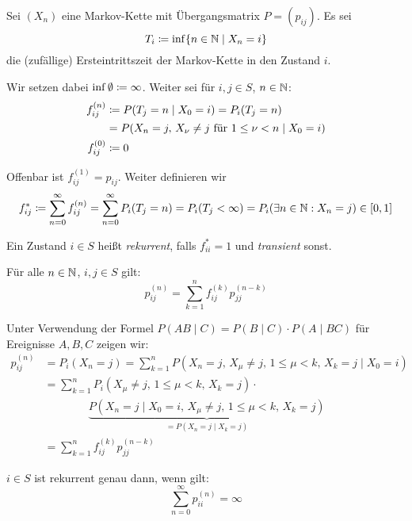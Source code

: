 \documentclass[a4paper,twoside,DIV15,BCOR12mm]{scrbook}
\begin{document}
\pagebreak[2]
Sei $(X_n)$ eine Markov-Kette mit Übergangsmatrix $P=(p_{ij})$. Es sei
\[
T_i \da \inf\{n\in\MdN\mid X_n =i\}
\]
die (zufällige) Ersteintrittszeit der Markov-Kette in den Zustand $i$.

Wir setzen dabei $\inf\emptyset \da \infty$. Weiter sei für $i,j\in S$, $n\in \mathbb{N}$:
\begin{align*}
f_{ij}^{(n)} &\da P(T_j=n\mid X_0=i) = P_i(T_j=n) \\
&=P(X_n=j,\, X_\nu\ne j \text{ für } 1 \le \nu < n\mid X_0=i) \\
f_{ij}^{(0)} &\da 0
\end{align*}

Offenbar ist $f_{ij}^{(1)} = p_{ij}$. Weiter definieren wir
\[
f_{ij}^{*} \da \sum_{n=0}^\infty f_{ij}^{(n)} = \sum_{n=0}^\infty P_i(T_j=n) = P_i(T_j<\infty) = P_i(\exists n\in \MdN: X_n=j)\in[0,1]
\]

\begin{definition}
Ein Zustand $i\in S$ heißt \emph{rekurrent}, falls $f_{ii}^{*} = 1$ und \emph{transient} sonst. %
\end{definition}

\begin{lemma}
\label{lem:2.2}Für alle $n\in\mathbb{N}$, $i,j\in S$ gilt:
\[
p_{ij}^{(n)} = \sum_{k=1}^n f_{ij}^{(k)} p_{jj}^{(n-k)}
\]
\end{lemma}

\begin{beweis}
Unter Verwendung der Formel $P(AB\mid C) = P(B\mid C)\cdot P(A\mid BC)$ für Ereignisse $A,B,C$ zeigen wir:
\begin{align*}
p_{ij}^{(n)} &= P_i(X_n=j) = \sum_{k=1}^n P({X_n=j},\, {X_\mu\ne j,\, 1\le\mu<k,\, X_k = j}\mid {X_0=i}) \\
&= \sum_{k=1}^n P_i(X_\mu\ne j,\, 1\le\mu<k,\, X_k = j)\cdot\\
&\quad\quad\quad\quad \underbrace{P(X_n=j\mid X_0=i,\,X_\mu\ne j,\, 1\le\mu<k,\, X_k = j)}_{=P(X_n=j\mid  X_k=j)}\\
&=\sum_{k=1}^nf_{ij}^{(k)} p_{jj}^{(n-k)}
\end{align*}
\end{beweis}

\begin{satz}
\label{satz2.3}%
$i\in S$ ist rekurrent genau dann, wenn gilt:
\[
\sum_{n=0}^\infty p_{ii}^{(n)} = \infty
\]
\end{satz}
\end{document}
